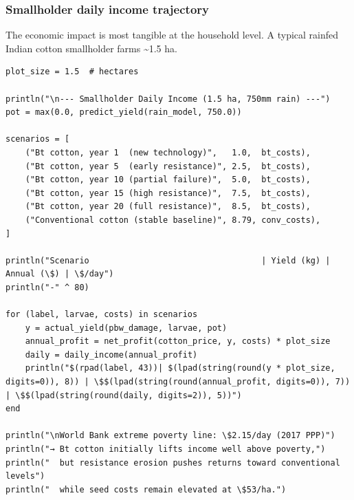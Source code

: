 \subsubsection{Smallholder daily income trajectory}



\label{15458628854641422662}{}


The economic impact is most tangible at the household level. A typical rainfed Indian cotton smallholder farms {\textasciitilde}1.5 ha.




\begin{verbatim}
plot_size = 1.5  # hectares

println("\n--- Smallholder Daily Income (1.5 ha, 750mm rain) ---")
pot = max(0.0, predict_yield(rain_model, 750.0))

scenarios = [
    ("Bt cotton, year 1  (new technology)",   1.0,  bt_costs),
    ("Bt cotton, year 5  (early resistance)", 2.5,  bt_costs),
    ("Bt cotton, year 10 (partial failure)",  5.0,  bt_costs),
    ("Bt cotton, year 15 (high resistance)",  7.5,  bt_costs),
    ("Bt cotton, year 20 (full resistance)",  8.5,  bt_costs),
    ("Conventional cotton (stable baseline)", 8.79, conv_costs),
]

println("Scenario                                   | Yield (kg) | Annual (\$) | \$/day")
println("-" ^ 80)

for (label, larvae, costs) in scenarios
    y = actual_yield(pbw_damage, larvae, pot)
    annual_profit = net_profit(cotton_price, y, costs) * plot_size
    daily = daily_income(annual_profit)
    println("$(rpad(label, 43))| $(lpad(string(round(y * plot_size, digits=0)), 8)) | \$$(lpad(string(round(annual_profit, digits=0)), 7)) | \$$(lpad(string(round(daily, digits=2)), 5))")
end

println("\nWorld Bank extreme poverty line: \$2.15/day (2017 PPP)")
println("→ Bt cotton initially lifts income well above poverty,")
println("  but resistance erosion pushes returns toward conventional levels")
println("  while seed costs remain elevated at \$53/ha.")
\end{verbatim}




